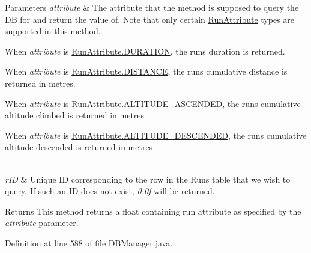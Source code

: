 \begin{DoxyParams}{Parameters}
{\em attribute} & The attribute that the method is supposed to query the DB for and return the value of. Note that only certain \mbox{\hyperlink{enumcom_1_1activitytracker_1_1_run_attribute}{Run\+Attribute}} types are supported in this method.
\begin{DoxyItemize}
\item When {\itshape attribute} is \mbox{\hyperlink{enumcom_1_1activitytracker_1_1_run_attribute_a7adf133b2a62f1f99ffc2adfb7097ec9}{Run\+Attribute.\+D\+U\+R\+A\+T\+I\+ON}}, the run\textquotesingle{}s duration is returned.
\item When {\itshape attribute} is \mbox{\hyperlink{enumcom_1_1activitytracker_1_1_run_attribute_a90ee541e68e458a0bb3f5ea45fd46ec0}{Run\+Attribute.\+D\+I\+S\+T\+A\+N\+CE}}, the run\textquotesingle{}s cumulative distance is returned in metres.
\item When {\itshape attribute} is \mbox{\hyperlink{enumcom_1_1activitytracker_1_1_run_attribute_abcfe85bf48187d67842a0525c1bcc0af}{Run\+Attribute.\+A\+L\+T\+I\+T\+U\+D\+E\+\_\+\+A\+S\+C\+E\+N\+D\+ED}}, the run\textquotesingle{}s cumulative altitude climbed is returned in metres
\item When {\itshape attribute} is \mbox{\hyperlink{enumcom_1_1activitytracker_1_1_run_attribute_a337a68867cfdb8ec7a17c318ad8b216b}{Run\+Attribute.\+A\+L\+T\+I\+T\+U\+D\+E\+\_\+\+D\+E\+S\+C\+E\+N\+D\+ED}}, the run\textquotesingle{}s cumulative altitude descended is returned in metres 
\end{DoxyItemize}\\
\hline
{\em r\+ID} & Unique ID corresponding to the row in the Runs table that we wish to query. If such an ID does not exist, {\itshape 0.\+0f} will be returned.\\
\hline
\end{DoxyParams}
\begin{DoxyReturn}{Returns}
This method returns a float containing run attribute as specified by the {\itshape attribute} parameter. 
\end{DoxyReturn}


Definition at line 588 of file D\+B\+Manager.\+java.


